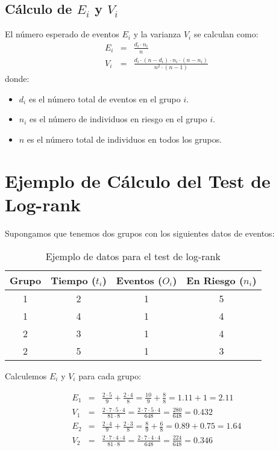 \documentclass[a4paper]{report} %
\begin{document}
\subsection{C\'alculo de $E_i$ y $V_i$}
El n\'umero esperado de eventos $E_i$ y la varianza $V_i$ se calculan como:
\begin{eqnarray*}
E_i &=& \frac{d_i \cdot n_i}{n} \\
V_i &=& \frac{d_i \cdot (n - d_i) \cdot n_i \cdot (n - n_i)}{n^2 \cdot (n - 1)}
\end{eqnarray*}
donde:
\begin{itemize}
    \item $d_i$ es el n\'umero total de eventos en el grupo $i$.
    \item $n_i$ es el n\'umero de individuos en riesgo en el grupo $i$.
    \item $n$ es el n\'umero total de individuos en todos los grupos.
\end{itemize}

\section{Ejemplo de C\'alculo del Test de Log-rank}
Supongamos que tenemos dos grupos con los siguientes datos de eventos:

\begin{table}[h]
\centering
\begin{tabular}{|c|c|c|c|}
\hline
Grupo & Tiempo ($t_i$) & Eventos ($O_i$) & En Riesgo ($n_i$) \\
\hline
1 & 2 & 1 & 5 \\
1 & 4 & 1 & 4 \\
2 & 3 & 1 & 4 \\
2 & 5 & 1 & 3 \\
\hline
\end{tabular}
\caption{Ejemplo de datos para el test de log-rank}
\end{table}

Calculemos $E_i$ y $V_i$ para cada grupo:

\begin{eqnarray*}
E_1 &=& \frac{2 \cdot 5}{9} + \frac{2 \cdot 4}{8} = \frac{10}{9} + \frac{8}{8} = 1.11 + 1 = 2.11 \\
V_1 &=& \frac{2 \cdot 7 \cdot 5 \cdot 4}{81 \cdot 8} = \frac{2 \cdot 7 \cdot 5 \cdot 4}{648} = \frac{280}{648} = 0.432 \\
E_2 &=& \frac{2 \cdot 4}{9} + \frac{2 \cdot 3}{8} = \frac{8}{9} + \frac{6}{8} = 0.89 + 0.75 = 1.64 \\
V_2 &=& \frac{2 \cdot 7 \cdot 4 \cdot 4}{81 \cdot 8} = \frac{2 \cdot 7 \cdot 4 \cdot 4}{648} = \frac{224}{648} = 0.346 \\
\end{eqnarray*}
\end{document}
